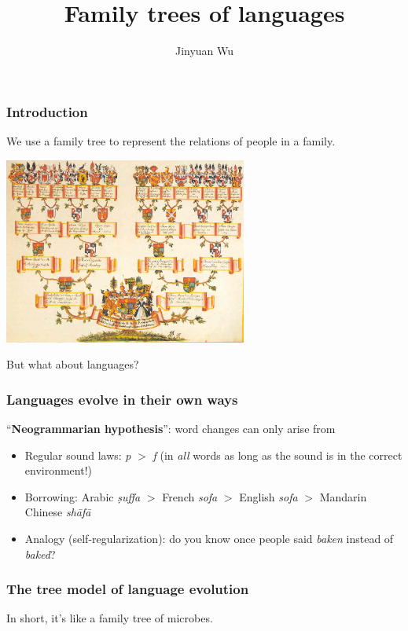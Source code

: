 \documentclass{beamer}
\title{Family trees of languages}
\author{Jinyuan Wu}
\newcommand{\corpus}[1]{\textit{#1}}
\begin{document}
\frame{\titlepage}

\begin{frame}
\frametitle{Introduction}

We use a family tree to represent the relations of people in a family.

\begin{center}
    \includegraphics[width=0.6\textwidth]{photos/Waldburg-Ahnentafel.jpg}
\end{center} 

But what about languages?

\end{frame}

\begin{frame}
\frametitle{Languages evolve in their own ways}

``\textbf{Neogrammarian hypothesis}'':
word changes can only arise from
\begin{itemize}
    \item Regular sound laws: \corpus{p} $>$ \corpus{f} (in \emph{all} words as long as the sound is in the correct environment!)
    \item Borrowing: Arabic \corpus{ṣuffa} $>$ French \corpus{sofa} $>$ English \corpus{sofa} $>$ Mandarin Chinese \corpus{sh\={a}f\={a}} 
    \item Analogy (self-regularization): do you know once people said \corpus{baken} instead of \corpus{baked}?
\end{itemize}    

\end{frame}

\begin{frame}
\frametitle{The tree model of language evolution}

\begin{center}
    
\end{center} 

In short, it's like a family tree of microbes.

\end{frame}
\end{document}
